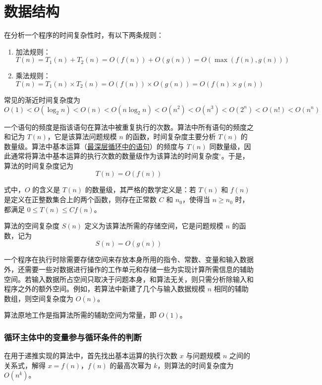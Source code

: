 \documentclass[UTF8]{ctexart}
\begin{document}
	
	\section{数据结构}
	
	在分析一个程序的时间复杂性时，有以下两条规则：
	\begin{enumerate}
		\item 加法规则：\( T(n) = T_1(n) + T_2(n) = O(f(n)) + O(g(n)) = O(\max(f(n), g(n))) \)
		\item 乘法规则：\( T(n) = T_1(n) \times T_2(n) = O(f(n)) \times O(g(n)) = O(f(n) \times g(n)) \)
	\end{enumerate}
	
	常见的渐近时间复杂度为  
	\[ O(1) < O(\log_2 n) < O(n) < O(n\log_2 n) < O(n^2) < O(n^3) < O(2^n) < O(n!) < O(n^n) \]
	
	一个语句的频度是指该语句在算法中被重复执行的次数。算法中所有语句的频度之和记为 \( T(n) \)，它是该算法问题规模 \( n \) 的函数，时间复杂度主要分析 \( T(n) \) 的数量级。算法中基本运算（\underline{最深层循环中的语句}）的频度与 \( T(n) \) 同数量级，因此通常将算法中基本运算的执行次数的数量级作为该算法的时间复杂度\(^{\circ}\)。于是，算法的时间复杂度记为  
	\[ T(n) = O(f(n)) \]  
	
	式中，\( O \) 的含义是 \( T(n) \) 的数量级，其严格的数学定义是：若 \( T(n) \) 和 \( f(n) \) 是定义在正整数集合上的两个函数，则存在正常数 \( C \) 和 \( n_0 \)，使得当 \( n \geq n_0 \) 时，都满足 \( 0 \leq T(n) \leq C f(n) \)。
	
	
	算法的空间复杂度 \( S(n) \) 定义为该算法所需的存储空间，它是问题规模 \( n \) 的函数，记为  
	\[ S(n) = O(g(n)) \]  
	
	
	一个程序在执行时除需要存储空间来存放本身所用的指令、常数、变量和输入数据外，还需要一些对数据进行操作的工作单元和存储一些为实现计算所需信息的辅助空间。若输入数据所占空间只取决于问题本身，和算法无关，则只需分析除输入和程序之外的额外空间。例如，若算法中新建了几个与输入数据规模 \( n \) 相同的辅助数组，则空间复杂度为 \( O(n) \)。
	
	算法原地工作是指算法所需的辅助空间为常量，即 \( O(1) \)。
	
	
	\subsubsection{循环主体中的变量参与循环条件的判断}
	
	在用于递推实现的算法中，首先找出基本运算的执行次数 \( x \) 与问题规模 \( n \) 之间的关系式，解得 \( x = f(n) \)，\( f(n) \) 的最高次幂为 \( k \)，则算法的时间复杂度为 \( O(n^k) \)。
	
\end{document}
